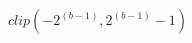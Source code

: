 \documentclass[preview]{standalone}
\begin{document}
\begin{align*}
clip(-2^(b-1), 2^(b-1) -1)
\end{align*}
\end{document}
